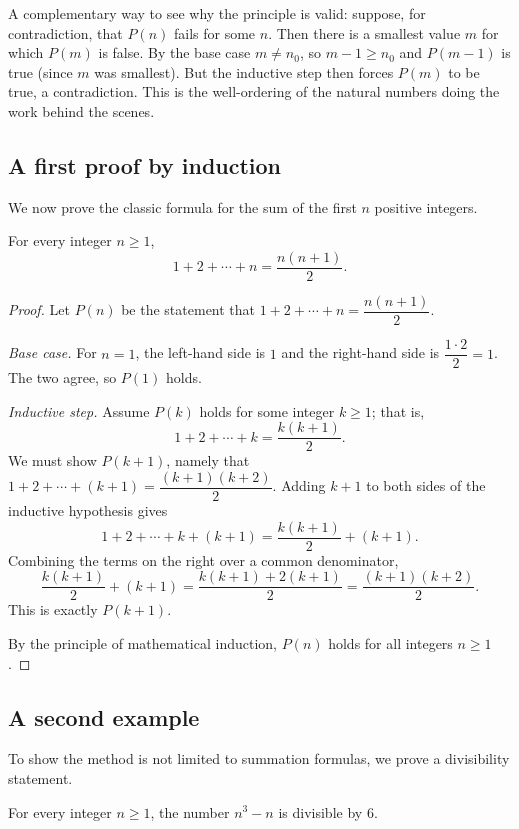 A complementary way to see why the principle is valid: suppose, for contradiction, that $P(n)$ fails for some $n$. Then there is a smallest value $m$ for which $P(m)$ is false. By the base case $m \neq n_0$, so $m - 1 \geq n_0$ and $P(m-1)$ is true (since $m$ was smallest). But the inductive step then forces $P(m)$ to be true, a contradiction. This is the well-ordering of the natural numbers doing the work behind the scenes.

\subsection{A first proof by induction}

We now prove the classic formula for the sum of the first $n$ positive integers.

\begin{theorem}\label{thm:sum}
For every integer $n \geq 1$,
\[
1 + 2 + \cdots + n = \frac{n(n+1)}{2}.
\]
\end{theorem}

\begin{proof}
Let $P(n)$ be the statement that $1 + 2 + \cdots + n = \dfrac{n(n+1)}{2}$.

\emph{Base case.} For $n = 1$, the left-hand side is $1$ and the right-hand side is $\dfrac{1 \cdot 2}{2} = 1$. The two agree, so $P(1)$ holds.

\emph{Inductive step.} Assume $P(k)$ holds for some integer $k \geq 1$; that is,
\[
1 + 2 + \cdots + k = \frac{k(k+1)}{2}.
\]
We must show $P(k+1)$, namely that $1 + 2 + \cdots + (k+1) = \dfrac{(k+1)(k+2)}{2}$. Adding $k+1$ to both sides of the inductive hypothesis gives
\[
1 + 2 + \cdots + k + (k+1) = \frac{k(k+1)}{2} + (k+1).
\]
Combining the terms on the right over a common denominator,
\[
\frac{k(k+1)}{2} + (k+1) = \frac{k(k+1) + 2(k+1)}{2} = \frac{(k+1)(k+2)}{2}.
\]
This is exactly $P(k+1)$.

By the principle of mathematical induction, $P(n)$ holds for all integers $n \geq 1$.
\end{proof}

\subsection{A second example}

To show the method is not limited to summation formulas, we prove a divisibility statement.

\begin{theorem}\label{thm:divisible}
For every integer $n \geq 1$, the number $n^3 - n$ is divisible by $6$.
\end{theorem}


